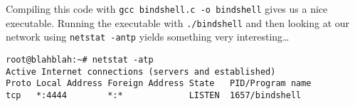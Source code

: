 \documentclass[11pt]{article}
\begin{document}
Compiling this code with \verb~gcc bindshell.c -o bindshell~ gives us a nice
executable. Running the executable with \verb~./bindshell~ and then looking
at our network using \verb~netstat -antp~ yields something very interesting\ldots{}

\begin{verbatim}
root@blahblah:~# netstat -atp
Active Internet connections (servers and established)
Proto Local Address Foreign Address State   PID/Program name
tcp   *:4444        *:*             LISTEN  1657/bindshell
\end{verbatim}
\end{document}
